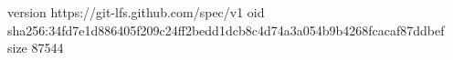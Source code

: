 version https://git-lfs.github.com/spec/v1
oid sha256:34fd7e1d886405f209c24ff2bedd1dcb8c4d74a3a054b9b4268fcacaf87ddbef
size 87544

